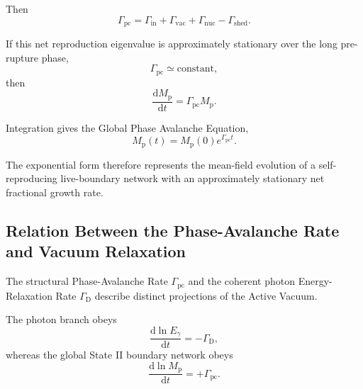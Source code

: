 Then
\begin{equation}
    \boxed{
    \Gamma_{\mathrm{pc}}
    =
    \Gamma_{\mathrm{in}}
    +
    \Gamma_{\mathrm{vac}}
    +
    \Gamma_{\mathrm{nuc}}
    -
    \Gamma_{\mathrm{shed}}.
    }
    \label{eq:AU_gamma_pc_components}
\end{equation}

If this net reproduction eigenvalue is approximately stationary over the
long pre-rupture phase,
\begin{equation}
    \Gamma_{\mathrm{pc}}
    \simeq
    \text{constant},
\end{equation}
then
\begin{equation}
    \frac{
        \mathrm dM_{\mathrm p}
    }{
        \mathrm dt
    }
    =
    \Gamma_{\mathrm{pc}}
    M_{\mathrm p}.
\end{equation}

Integration gives the Global Phase Avalanche Equation,
\begin{equation}
    \boxed{
    M_{\mathrm p}(t)
    =
    M_{\mathrm p}(0)
    e^{\Gamma_{\mathrm{pc}}t}.
    }
    \label{eq:AU_global_phase_avalanche}
\end{equation}

The exponential form therefore represents the mean-field evolution of a
self-reproducing live-boundary network with an approximately stationary net
fractional growth rate.


\subsection{Relation Between the Phase-Avalanche Rate and Vacuum Relaxation}

The structural Phase-Avalanche Rate
\(\Gamma_{\mathrm{pc}}\)
and the coherent photon Energy-Relaxation Rate
\(\Gamma_{\mathrm D}\)
describe distinct projections of the Active Vacuum.

The photon branch obeys
\begin{equation}
    \frac{
        \mathrm d\ln E_\gamma
    }{
        \mathrm dt
    }
    =
    -\Gamma_{\mathrm D},
\end{equation}
whereas the global State II boundary network obeys
\begin{equation}
    \frac{
        \mathrm d\ln M_{\mathrm p}
    }{
        \mathrm dt
    }
    =
    +\Gamma_{\mathrm{pc}}.
\end{equation}

